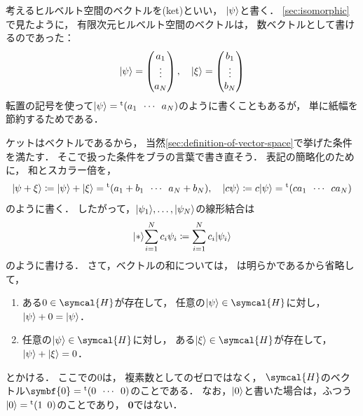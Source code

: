 \documentclass[
]{sotsu}
\begin{document}
考えるヒルベルト空間のベクトルを(ket)といい，
$\ket{\psi}$と書く．
\cref{sec:isomorphic}で見たように，
有限次元ヒルベルト空間のベクトルは，
数ベクトルとして書けるのであった：
\begin{equation*}
    \ket{\psi} = 
    \begin{pmatrix}
        a_1  \\  \vdots  \\  a_N
    \end{pmatrix}
    ,
    \quad
    \ket{\xi} = 
    \begin{pmatrix}
        b_1  \\  \vdots  \\  b_N
    \end{pmatrix}
\end{equation*}
転置の記号を使って$\ket{\psi} = \cvector{a_1 ; \cdots ; a_N}$のように書くこともあるが，
単に紙幅を節約するためである．

ケットはベクトルであるから，
当然\cref{sec:definition-of-vector-space}で挙げた条件を満たす．
そこで扱った条件をブラの言葉で書き直そう．
表記の簡略化のために，
和とスカラー倍を，
\begin{equation*}
    \ket{\psi + \xi} \coloneq \ket{\psi} + \ket{\xi}
    = \cvector{ a_1 + b_1 ; \cdots ; a_N + b_N }
    ,
    \quad 
    \ket{c \psi} \coloneq c \ket{\psi}
    = \cvector{c a_1; \cdots; c a_N}
\end{equation*}
のように書く．
したがって，$\ket{\psi_1}, \dots, \ket{\psi_N}$の線形結合は
\begin{equation*}
    \ket*{\sum_{i = 1}^{N} c_i \psi_i}
        \coloneq \sum_{i = 1}^{N} c_i \ket{\psi_i}
\end{equation*}
のように書ける．
さて，ベクトルの和については，
は明らかであるから省略して，
\begin{enumerate}
    \item[\labelcref*{vector:sum-zero}]
        ある$0 \in \symcal{H}$が存在して，
        任意の$\ket{\psi} \in \symcal{H}$に対し，
        $\ket{\psi} + 0 = \ket{\psi}$．
    \item[\labelcref*{vector:sum-opposite}]
        任意の$\ket{\psi} \in \symcal{H}$に対し，
        ある$\ket{\xi} \in \symcal{H}$が存在して，
        $\ket{\psi} + \ket{\xi} = 0$．
\end{enumerate}
とかける．
ここでの$0$は，
複素数としてのゼロではなく，
$\symcal{H}$のベクトル$\symbf{0} = \cvector{0 ; \cdots ; 0}$のことである．
なお，$\ket{0}$と書いた場合は，ふつう$\ket{0} = \cvector{1 ; 0}$のことであり，
$\symbf{0}$ではない．
\end{document}
